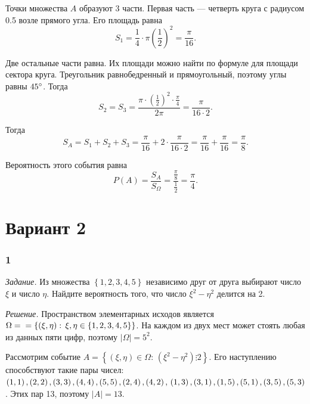 Точки множества $A$ образуют 3 части.
Первая часть --- четверть круга с радиусом 0.5 возле прямого угла.
Его площадь равна
$$S_1 =
\frac{1}{4} \cdot \pi \left( \frac{1}{2} \right)^2 =
\frac{ \pi }{16}.$$

Две остальные части равна.
Их площади можно найти по формуле для площади сектора круга.
Треугольник равнобедренный и прямоугольный, поэтому углы равны $45 \degree$.
Тогда
$$S_2 =
S_3 =
\frac{ \pi \cdot  \left( \frac{1}{2} \right)^2 \cdot \frac{ \pi }{4}}{2 \pi } =
\frac{ \pi }{16 \cdot 2}.$$

Тогда
$$S_A =
S_1 + S_2 + S_3 =
\frac{ \pi }{16} + 2 \cdot \frac{ \pi }{16 \cdot 2} =
\frac{ \pi }{16} + \frac{ \pi }{16} =
\frac{ \pi }{8}.$$

Вероятность этого события равна
$$P \left( A \right) =
\frac{S_A}{S_{ \Omega }} =
\frac{ \frac{ \pi }{8} }{ \frac{1}{2} } =
\frac{ \pi }{4}.$$

\section*{Вариант 2}

\subsubsection*{1}

\textit{Задание.} Из множества $ \left\{ 1, 2, 3, 4, 5 \right\} $ независимо друг от друга выбирают число $ \xi $ и число $ \eta $.
Найдите вероятность того, что число $ \xi^2 - \eta^2$ делится на 2.

\textit{Решение.}
Пространством элементарных исходов является
$ \Omega = \\
= \left\{ \left( \xi, \eta \right): \, \xi, \eta \in \left\{ 1, 2, 3, 4, 5 \right\} \right\} $.
На каждом из двух мест может стоять любая из данных пяти цифр, поэтому $ \left| \Omega \right| = 5^2$.

Рассмотрим событие $A = \left\{ \left( \xi, \eta \right) \in \Omega: \, \left( \xi^2 - \eta^2 \right) \vdots 2 \right\} $.
Его наступлению способствуют такие пары чисел:
$ \left( 1, 1 \right), \left( 2, 2 \right),
\left( 3, 3 \right), \left( 4, 4 \right),
\left( 5, 5 \right), \left( 2, 4 \right),
\left( 4, 2 \right), \\
\left( 1, 3 \right), \left( 3, 1 \right), \left( 1, 5 \right), \left( 5, 1 \right), \left( 3, 5 \right), \left( 5, 3 \right) $.
Этих пар 13, поэтому $ \left| A \right| = 13$.

